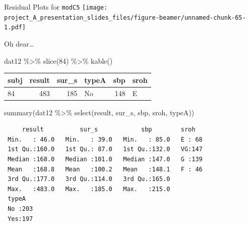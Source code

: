 \documentclass[
  ignorenonframetext,
]{beamer}
\newenvironment{Shaded}{\begin{snugshade}}{\end{snugshade}}
\newcommand{\DecValTok}[1]{\textcolor[rgb]{0.00,0.00,0.81}{#1}}
\newcommand{\FunctionTok}[1]{\textcolor[rgb]{0.00,0.00,0.00}{#1}}
\newcommand{\NormalTok}[1]{#1}
\newcommand{\SpecialCharTok}[1]{\textcolor[rgb]{0.00,0.00,0.00}{#1}}
\begin{document}
\begin{frame}{Residual Plots for \texttt{modC5}}
\protect\hypertarget{residual-plots-for-modc5-1}{}
\texttt{[image: project\_A\_presentation\_slides\_files/figure-beamer/unnamed-chunk-65-1.pdf]}
\end{frame}

\begin{frame}[fragile]{Oh dear\ldots{}}
\protect\hypertarget{oh-dear}{}
\begin{Shaded}
\begin{Highlighting}[]
\NormalTok{dat12 }\SpecialCharTok{\%\textgreater{}\%} \FunctionTok{slice}\NormalTok{(}\DecValTok{84}\NormalTok{) }\SpecialCharTok{\%\textgreater{}\%} \FunctionTok{kable}\NormalTok{()}
\end{Highlighting}
\end{Shaded}

\begin{longtable}[]{@{}lrrlrl@{}}
\toprule
subj & result & sur\_s & typeA & sbp & sroh \\
\midrule
\endhead
84 & 483 & 185 & No & 148 & E \\
\bottomrule
\end{longtable}

\begin{Shaded}
\begin{Highlighting}[]
\FunctionTok{summary}\NormalTok{(dat12 }\SpecialCharTok{\%\textgreater{}\%} \FunctionTok{select}\NormalTok{(result, sur\_s, sbp, sroh, typeA))}
\end{Highlighting}
\end{Shaded}

\begin{verbatim}
     result          sur_s            sbp        sroh    
 Min.   : 46.0   Min.   : 39.0   Min.   : 85.0   E : 68  
 1st Qu.:160.0   1st Qu.: 87.0   1st Qu.:132.0   VG:147  
 Median :168.0   Median :101.0   Median :147.0   G :139  
 Mean   :168.8   Mean   :100.2   Mean   :148.1   F : 46  
 3rd Qu.:177.0   3rd Qu.:114.0   3rd Qu.:165.0           
 Max.   :483.0   Max.   :185.0   Max.   :215.0           
 typeA    
 No :203  
 Yes:197  
          
          
          
          
\end{verbatim}
\end{frame}
\end{document}

